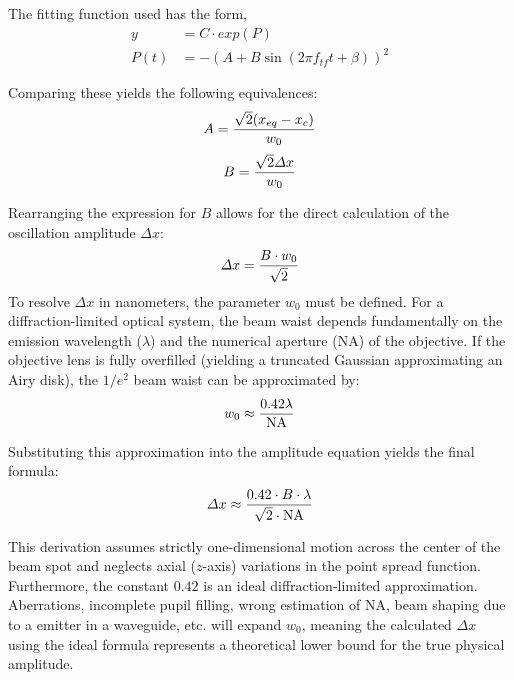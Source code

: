 The fitting function used has the form,
\begin{equation}\label{eq:grad_fit}
    \begin{split}
    y &= C \cdot exp(P) \\
    P(t) &= -(A + B \sin(2 \pi f_{tf} t + \beta))^2
    \end{split}
\end{equation}

Comparing these yields the following equivalences:
\begin{equation}
    \centering
    A = \frac{\sqrt{2}(x_{eq} - x_c)}{w_0}
\end{equation}
\begin{equation}
    \centering
    B = \frac{\sqrt{2}\Delta x}{w_0}
\end{equation}

Rearranging the expression for $B$ allows for the direct calculation of the oscillation amplitude $\Delta x$:
\begin{equation}
    \centering
    \Delta x = \frac{B \cdot w_0}{\sqrt{2}}
\end{equation}
To resolve $\Delta x$ in nanometers, the parameter $w_0$ must be defined. For a diffraction-limited optical system, the beam waist depends fundamentally on the emission wavelength ($\lambda$) and the numerical aperture ($\text{NA}$) of the objective. If the objective lens is fully overfilled (yielding a truncated Gaussian approximating an Airy disk), the $1/e^2$ beam waist can be approximated by:
\begin{equation}
    \centering
    w_0 \approx \frac{0.42 \lambda}{\text{NA}}
\end{equation}

Substituting this approximation into the amplitude equation yields the final formula\cite{zhangGaussianApproximationsFluorescence2007}:
\begin{equation}
    \centering
    \Delta x \approx \frac{0.42 \cdot B \cdot \lambda}{\sqrt{2} \cdot \text{NA}}
\end{equation}


This derivation assumes strictly one-dimensional motion across the center of the beam spot and neglects axial ($z$-axis) variations in the point spread function. Furthermore, the constant $0.42$ is an ideal diffraction-limited approximation. Aberrations, incomplete pupil filling, wrong estimation of \gls{NA}, beam shaping due to a emitter in a waveguide, etc. will expand $w_0$, meaning the calculated $\Delta x$ using the ideal formula represents a theoretical lower bound for the true physical amplitude.

